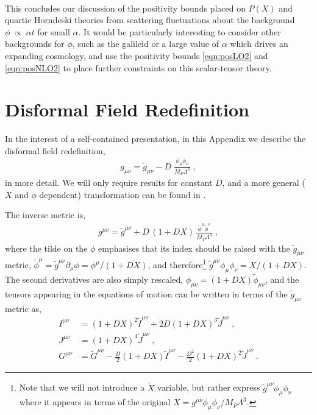 \documentclass[11pt]{article}
\begin{document}
~\\
This concludes our discussion of the positivity bounds placed on $P(X)$ and quartic Horndeski theories from scattering fluctuations about the background $\phi \; \propto \; \alpha t$ for small $\alpha$. 
It would be particularly interesting to consider other backgrounds for $\phi$, such as the galileid \cite{Nicolis:2015sra} or a large value of $\alpha$ which drives an expanding cosmology, and use the positivity bounds \eqref{eqn:posLO2} and \eqref{eqn:posNLO2} to place further constraints on this scalar-tensor theory. 




\section{Disformal Field Redefinition}
\label{app:disformal}

In the interest of a self-contained presentation, in this Appendix we describe the disformal field redefinition,
\begin{align}
 g_{\mu\nu} = \tilde{g}_{\mu\nu} - D \;  \frac{ \phi_\mu \phi_\nu}{ M_P \Lambda^3} \; ,  \label{eqn:dis_redef}
\end{align}
in more detail. We will only require results for constant $D$, and a more general ($X$ and $\phi$ dependent) transformation can be found in \cite{Zumalacarregui:2012us, Bettoni:2013diz, Zumalacarregui:2013pma, Achour:2016rkg}. 

The inverse metric is,
\begin{align}
g^{\mu\nu} =  \tilde{g}^{\mu\nu}  +   D \, ( 1 + D X )  \,  \frac{ \tilde{\phi}^\mu \tilde{\phi}^\nu}{ M_P \Lambda^3} \; ,
\end{align}
where the tilde on the $\phi$ emphasises that its index should be raised with the $\tilde{g}_{\mu\nu}$ metric, $\tilde{\phi}^\mu = \tilde{g}^{\mu\nu} \partial_\mu \phi = \phi^\mu / (1+ D X)$, and therefore\footnote{
Note that we will not introduce a $\tilde{X}$ variable, but rather express $\tilde{g}^{\mu\nu} \phi_\mu \phi_\nu$ where it appears in terms of the original $X = g^{\mu\nu} \phi_\mu \phi_\nu / M_P \Lambda^3$. 
} $\tilde{g}^{\mu\nu} \phi_\mu \phi_\nu = X / (1 + D X )$. 
The second derivatives are also simply rescaled, $\phi_{\mu\nu} = ( 1 + D X ) \tilde{\phi}_{\mu\nu}$, and the tensors appearing in the equations of motion can be written in terms of the $\tilde{g}_{\mu\nu}$ metric as,
\begin{align}
I^{\mu\nu} &=  ( 1 + D X )^2  \tilde{I}^{\mu\nu}  +   2 D ( 1 + D X )^3  \tilde{J}^{\mu\nu}  \;  ,  \nonumber \\
J^{\mu\nu} &=  ( 1 + D X )^4  \tilde{J}^{\mu\nu}  \; ,  \nonumber \\
G^{\mu\nu} &= \tilde{G}^{\mu\nu} -  \frac{D}{2} (1 + D X )  \tilde{I}^{\mu\nu} - \frac{D^2}{2}  (1  + D X )^2  \tilde{J}^{\mu\nu}  \; . 
\end{align}
\end{document}
